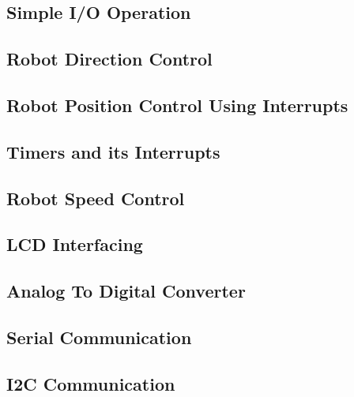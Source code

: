 \documentclass[a4paper,10pt,oneside]{article}
\begin{document}
		\subsection{\huge Simple I/O Operation}
		\subsection{\huge Robot Direction Control}
		\subsection{\huge Robot Position Control Using Interrupts}
		\subsection{\huge Timers and its Interrupts}
		\subsection{\huge Robot Speed Control}
		\subsection{\huge LCD Interfacing}
		\subsection{\huge Analog To Digital Converter}
		\subsection{\huge Serial Communication}
		\subsection{\huge I2C Communication}
\end{document}
